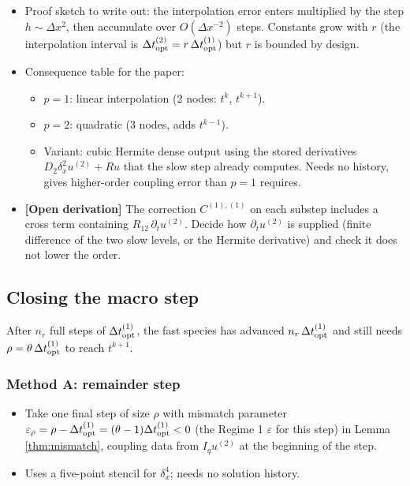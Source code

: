 \begin{itemize}
  \item Proof sketch to write out: the interpolation error enters multiplied by the step $h \sim \Delta x^2$, then accumulate over $O(\Delta x^{-2})$ steps. Constants grow with $r$ (the interpolation interval is $\Delta t_{\mathrm{opt}}^{(2)} = r\,\Delta t_{\mathrm{opt}}^{(1)}$) but $r$ is bounded by design.
  \item Consequence table for the paper:
  \begin{itemize}
    \item $p=1$: linear interpolation (2 nodes: $t^k$, $t^{k+1}$).
    \item $p=2$: quadratic (3 nodes, adds $t^{k-1}$).
    \item Variant: cubic Hermite dense output using the stored derivatives $D_2\delta_x^2 u^{(2)} + R u$ that the slow step already computes. Needs no history, gives higher-order coupling error than $p=1$ requires.
  \end{itemize}
  \item \textbf{[Open derivation]} The correction $C^{(1),(1)}$ on each substep includes a cross term containing $R_{12}\,\partial_t u^{(2)}$. Decide how $\partial_t u^{(2)}$ is supplied (finite difference of the two slow levels, or the Hermite derivative) and check it does not lower the order.
\end{itemize}

\subsection{Closing the macro step}

After $n_r$ full steps of $\Delta t_{\mathrm{opt}}^{(1)}$, the fast species has advanced $n_r\,\Delta t_{\mathrm{opt}}^{(1)}$ and still needs $\rho = \theta\,\Delta t_{\mathrm{opt}}^{(1)}$ to reach $t^{k+1}$.

\subsubsection{Method A: remainder step}

\begin{itemize}
  \item Take one final step of size $\rho$ with mismatch parameter $\varepsilon_\rho = \rho - \Delta t_{\mathrm{opt}}^{(1)} = (\theta - 1)\Delta t_{\mathrm{opt}}^{(1)} < 0$ (the Regime 1 $\varepsilon$ for this step) in Lemma \ref{thm:mismatch}, coupling data from $I_q u^{(2)}$ at the beginning of the step.
  \item Uses a five-point stencil for $\delta_x^4$; needs no solution history.
\end{itemize}

